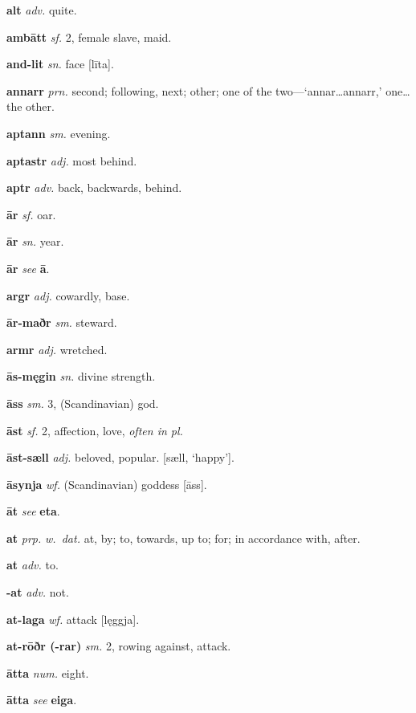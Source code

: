 \documentclass[12pt,letterpaper]{book}
\begin{document}
\noindent
\textbf{alt} \textit{adv.} quite.

\noindent
\textbf{ambātt} \textit{sf.} 2, female slave, maid.

\noindent
\textbf{and-lit} \textit{sn.} face [līta].

\noindent
\textbf{annarr} \textit{prn.} second; following, next; other; one of the
	two---`annar\ldots annarr,' one\ldots the other.

\noindent
\textbf{aptann} \textit{sm.} evening.

\noindent
\textbf{aptastr} \textit{adj.} most behind.

\noindent
\textbf{aptr} \textit{adv.} back, backwards, behind.

\noindent
\textbf{ār} \textit{sf.} oar.

\noindent
\textbf{ār} \textit{sn.} year.

\noindent
\textbf{ār} \textit{} \textit{see} \textbf{ā}.

\noindent
\textbf{argr} \textit{adj.} cowardly, base.

\noindent
\textbf{ār-maðr} \textit{sm.} steward.

\noindent
\textbf{armr} \textit{adj.} wretched.

\noindent
\textbf{ās-męgin} \textit{sn.} divine strength.

\noindent
\textbf{āss} \textit{sm.} 3, (Scandinavian) god.

\noindent
\textbf{āst} \textit{sf.} 2, affection, love, \textit{often in pl.}

\noindent
\textbf{āst-sæll} \textit{adj.} beloved, popular.  [sæll, `happy'].

\noindent
\textbf{āsynja} \textit{wf.} (Scandinavian) goddess [āss].

\noindent
\textbf{āt} \textit{} \textit{see} \textbf{eta}.

\noindent
\textbf{at} \textit{prp.} \textit{w.\ dat.} at, by; to, towards, up to; for; in accordance
    with, after.

\noindent
\textbf{at} \textit{adv.} to.

\noindent
\textbf{-at} \textit{adv.} not.

\noindent
\textbf{at-laga} \textit{wf.} attack [lęggja].

\noindent
\textbf{at-rōðr (-rar)} \textit{sm.} 2, rowing against, attack.

\noindent
\textbf{ātta} \textit{num.} eight.

\noindent
\textbf{ātta} \textit{} \textit{see} \textbf{eiga}.
\end{document}
